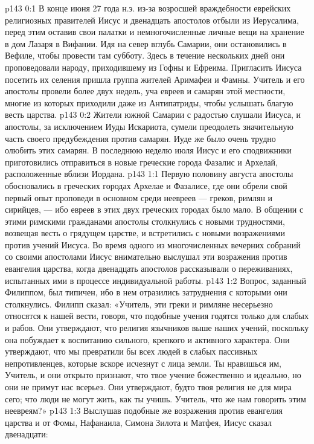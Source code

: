 \author{Комиссия срединников}
\vs p143 0:1 В конце июня 27 года н.э. из\hyp{}за возросшей враждебности еврейских религиозных правителей Иисус и двенадцать апостолов отбыли из Иерусалима, перед этим оставив свои палатки и немногочисленные личные вещи на хранение в дом Лазаря в Вифании. Идя на север вглубь Самарии, они остановились в Вефиле, чтобы провести там субботу. Здесь в течение нескольких дней они проповедовали народу, приходившему из Гофны и Ефреима. Пригласить Иисуса посетить их селения пришла группа жителей Аримафеи и Фамны. Учитель и его апостолы провели более двух недель, уча евреев и самарян этой местности, многие из которых приходили даже из Антипатриды, чтобы услышать благую весть царства.
\vs p143 0:2 Жители южной Самарии с радостью слушали Иисуса, и апостолы, за исключением Иуды Искариота, сумели преодолеть значительную часть своего предубеждения против самарян. Иуде же было очень трудно олюбить этих самарян. В последнюю неделю июля Иисус и его сподвижники приготовились отправиться в новые греческие города Фазалис и Архелай, расположенные вблизи Иордана.
\vs p143 1:1 Первую половину августа апостолы обосновались в греческих городах Архелае и Фазалисе, где они обрели свой первый опыт проповеди в основном среди неевреев --- греков, римлян и сирийцев, --- ибо евреев в этих двух греческих городах было мало. В общении с этими римскими гражданами апостолы столкнулись с новыми трудностями, возвещая весть о грядущем царстве, и встретились с новыми возражениями против учений Иисуса. Во время одного из многочисленных вечерних собраний со своими апостолами Иисус внимательно выслушал эти возражения против евангелия царства, когда двенадцать апостолов рассказывали о переживаниях, испытанных ими в процессе индивидуальной работы.
\vs p143 1:2 Вопрос, заданный Филиппом, был типичен, ибо в нем отразились затруднения с которыми они столкнулись. Филипп сказал: «Учитель, эти греки и римляне несерьезно относятся к нашей вести, говоря, что подобные учения годятся только для слабых и рабов. Они утверждают, что религия язычников выше наших учений, поскольку она побуждает к воспитанию сильного, крепкого и активного характера. Они утверждают, что мы превратили бы всех людей в слабых пассивных непротивленцев, которые вскоре исчезнут с лица земли. Ты нравишься им, Учитель, и они открыто признают, что твое учение божественно и идеально, но они не примут нас всерьез. Они утверждают, будто твоя религия не для мира сего; что люди не могут жить, как ты учишь. Учитель, что же нам говорить этим неевреям?»
\vs p143 1:3 Выслушав подобные же возражения против евангелия царства и от Фомы, Нафанаила, Симона Зилота и Матфея, Иисус сказал двенадцати:
